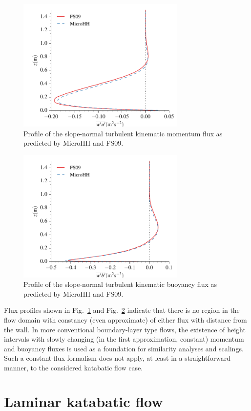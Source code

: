 \documentclass[gmd]{copernicus}
\begin{document}
\begin{figure}
\centerline{\includegraphics[width=8.3cm]{figs/katabatic_wu.pdf}}
\caption{Profile of the slope-normal turbulent kinematic momentum flux as predicted by MicroHH and FS09.}
\label{katabatic_wu}
\end{figure}
 
\begin{figure}
\centerline{\includegraphics[width=8.3cm]{figs/katabatic_wb.pdf}}
\caption{Profile of the slope-normal turbulent kinematic buoyancy flux as predicted by MicroHH and FS09.}
\label{katabatic_wb}
\end{figure}

Flux profiles shown in Fig.~\ref{katabatic_wu} and Fig.~\ref{katabatic_wb} indicate that there is no region in the flow domain with constancy (even approximate) of either flux with distance from the wall. In more conventional boundary-layer type flows, the existence of height intervals with slowly changing (in the first approximation, constant) momentum and buoyancy fluxes is used as a foundation for similarity analyses and scalings. Such a constant-flux formalism does not apply, at least in a straightforward manner, to the considered katabatic flow case.

\section{Laminar katabatic flow}
\end{document}
